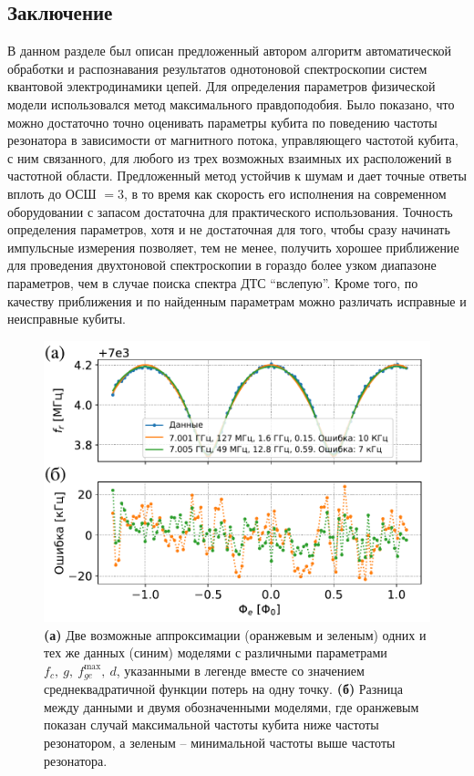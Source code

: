 \documentclass[14pt, a4paper]{extreport}
\numberwithin{equation}{section}
\begin{document}
\subsection{Заключение}

	В данном разделе был описан предложенный автором алгоритм автоматической обработки и распознавания результатов однотоновой спектроскопии систем квантовой электродинамики цепей. Для определения параметров физической модели использовался метод максимального правдоподобия. Было показано, что можно достаточно точно оценивать параметры кубита по поведению частоты резонатора в зависимости от магнитного потока, управляющего частотой кубита, с ним связанного, для любого из трех возможных взаимных их расположений в частотной области. Предложенный метод устойчив к шумам и дает точные ответы вплоть до ОСШ $=3$, в то время как скорость его исполнения на современном оборудовании с запасом достаточна для практического использования. Точность определения параметров, хотя и не достаточная для того, чтобы сразу начинать импульсные измерения позволяет, тем не менее, получить хорошее приближение для проведения двухтоновой спектроскопии в гораздо более узком диапазоне параметров, чем в случае поиска спектра ДТС ``вслепую''. Кроме того, по качеству приближения и по найденным параметрам можно различать исправные и неисправные кубиты.
	
	\begin{figure}
		\centering
		\includegraphics[width=0.7\linewidth]{Pictures/alternative_fits}
		\caption{\textbf{(а)} Две возможные аппроксимации (оранжевым и зеленым) одних и тех же данных (синим) моделями с различными параметрами $f_c,\ g,\ f_{ge}^\text{max},\ d$, указанными в легенде вместе со значением среднеквадратичной функции потерь на одну точку. \textbf{(б)} Разница между данными и двумя обозначенными моделями, где оранжевым показан случай максимальной частоты кубита ниже частоты резонатором, а зеленым -- минимальной частоты выше частоты резонатора.}
		\label{fig:alternativefits}
	\end{figure}
	
\end{document}
